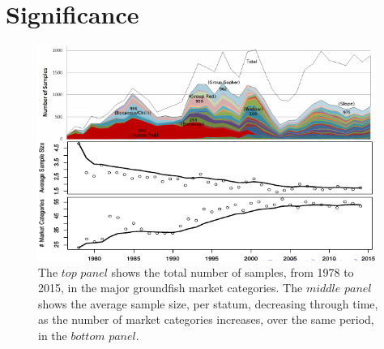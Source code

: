 \documentclass[12pt]{article}
\begin{document}
%

%
\section{Significance}\label{significance}
%
\begin{figure}[h!]
	\centering
	\begin{minipage}[c]{0.76\textwidth}
		\includegraphics[width=0.98\textwidth]{sampleComplex.png}
	\end{minipage}\hfill
	\begin{minipage}[c]{0.24\textwidth}
		\caption{
		The $top$ $panel$ shows the total number of samples, from 1978 to 2015, in the major groundfish market categories.
		The $middle$ $panel$ shows the average sample size, per statum, decreasing through time, as the number of market categories increases, over the same period, in the $bottom$ $panel$.
		}
	\end{minipage}
\end{figure}
\end{document}
